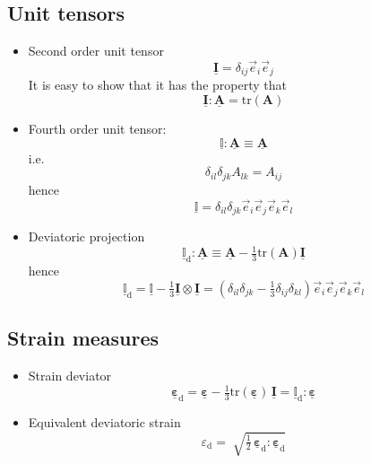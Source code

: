\documentclass[times,namecite]{goose-article}
\newcommand\T[1]{\underline{\bm{{#1}}}}
\newcommand\TT[1]{\underline{\mathbb{{#1}}}}
\begin{document}
\subsection{Unit tensors}
\label{sec:nomenclature:unit}

\begin{itemize}
%
\item Second order unit tensor
\begin{equation}
  \T{I} = \delta_{ij} \vec{e}_i \vec{e}_j
\end{equation}
It is easy to show that it has the property that
\begin{equation}
  \T{I} : \T{A} = \text{tr} ( \bm{A} )
\end{equation}
%
\item Fourth order unit tensor:
\begin{equation}
  \TT{I} : \T{A} \equiv \T{A}
\end{equation}
i.e.
\begin{equation}
  \delta_{il} \delta_{jk} A_{lk} = A_{ij}
\end{equation}
hence
\begin{equation}
  \TT{I} = \delta_{il} \delta_{jk} \vec{e}_i \vec{e}_j \vec{e}_k \vec{e}_l
\end{equation}
%
\item Deviatoric projection
\begin{equation}
  \TT{I}_\mathrm{d} : \T{A} \equiv \T{A} - \tfrac{1}{3} \text{tr} ( \bm{A} ) \T{I}
\end{equation}
hence
\begin{equation}
  \TT{I}_\mathrm{d} = \TT{I} - \tfrac{1}{3} \T{I} \otimes \T{I}
  = \left( \delta_{il} \delta_{jk} - \tfrac{1}{3} \delta_{ij} \delta_{kl} \right) \vec{e}_i \vec{e}_j \vec{e}_k \vec{e}_l
\end{equation}
%
\end{itemize}


\subsection{Strain measures}
\label{sec:nomenclature::strain}

\begin{itemize}
%
\item Strain deviator
\begin{equation}
  \T{\varepsilon}_\mathrm{d}
  = \T{\varepsilon} - \tfrac{1}{3} \text{tr} ( \T{\varepsilon} ) \, \T{I}
  = \TT{I}_\mathrm{d} : \T{\varepsilon}
\end{equation}
%
\item Equivalent deviatoric strain
\begin{equation}
  \varepsilon_\mathrm{d}
  = \; \sqrt{
    \tfrac{1}{2} \, \T{\varepsilon}_\mathrm{d} : \T{\varepsilon}_\mathrm{d}
  }
\end{equation}
%
\end{itemize}
\end{document}
